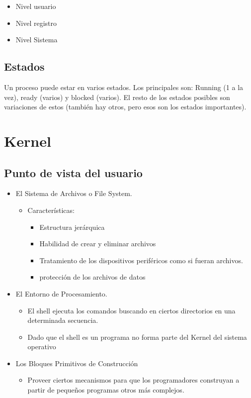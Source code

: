 \documentclass{article}
\begin{document}
\begin{itemize}
\item
  Nivel usuario
\item
  Nivel registro
\item
  Nivel Sistema
\end{itemize}

\subsection{\texorpdfstring{Estados }{Estados }}\label{estados}

Un proceso puede estar en varios estados. Los principales son: Running
(1 a la vez), ready (varios) y blocked (varios). El resto de los estados
posibles son variaciones de estos (también hay otros, pero esos son los
estados importantes).

\section{Kernel}\label{kernel}

\subsection{Punto de vista del
usuario}\label{punto-de-vista-del-usuario}

\begin{itemize}
\item
  El Sistema de Archivos o File System.

  \begin{itemize}
  \item
    Características:

    \begin{itemize}
    \item
      Estructura jerárquica
    \item
      Habilidad de crear y eliminar archivos
    \item
      Tratamiento de los dispositivos periféricos como si fueran
      archivos.
    \item
      protección de los archivos de datos
    \end{itemize}
  \end{itemize}
\item
  El Entorno de Procesamiento.

  \begin{itemize}
  \item
    El shell ejecuta los comandos buscando en ciertos directorios en una
    determinada secuencia.
  \item
    Dado que el shell es un programa no forma parte del Kernel del
    sistema operativo
  \end{itemize}
\item
  Los Bloques Primitivos de Construcción

  \begin{itemize}
  \item
    Proveer ciertos mecanismos para que los programadores construyan a
    partir de pequeños programas otros más complejos.
  \end{itemize}
\end{itemize}
\end{document}
